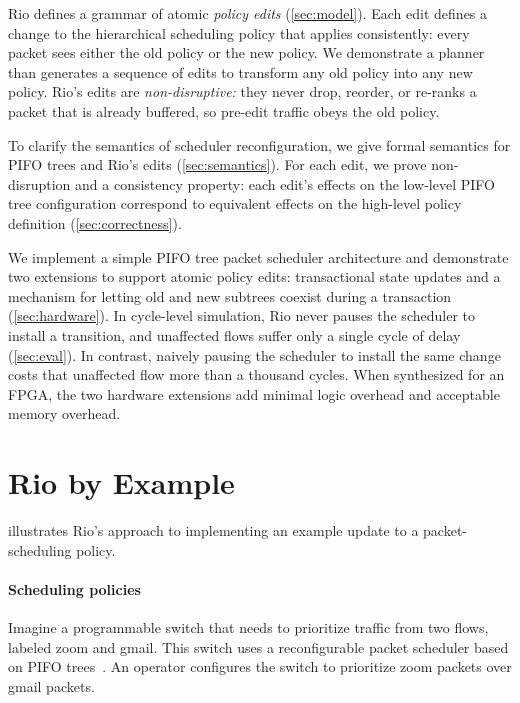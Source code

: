 \documentclass[sigplan,anonymous,review,nonacm]{acmart}
\begin{document}
Rio defines a grammar of atomic \emph{policy edits} (\cref{sec:model}).
Each edit defines a change to the hierarchical scheduling policy that applies consistently:
every packet sees either the old policy or the new policy.
We demonstrate a planner than generates a sequence of edits to transform any old policy into any new policy.
Rio's edits are \emph{non-disruptive:}
they never drop, reorder, or re-ranks a packet that is already buffered,
so pre-edit traffic obeys the old policy.

To clarify the semantics of scheduler reconfiguration,
we give formal semantics for PIFO trees and Rio's edits (\cref{sec:semantics}).
For each edit, we prove non-disruption and a consistency property:
each edit's effects on the low-level PIFO tree configuration
correspond to equivalent effects on the high-level policy definition (\cref{sec:correctness}).

We implement a simple PIFO tree packet scheduler architecture and demonstrate two extensions to support atomic policy edits:
transactional state updates and a mechanism for letting old and new subtrees coexist during a transaction (\cref{sec:hardware}).
In cycle-level simulation, Rio never pauses the scheduler to install a transition, and unaffected flows suffer only a single cycle of delay (\cref{sec:eval}).
In contrast, naively pausing the scheduler to install the same change costs that unaffected flow more than a thousand cycles.
When synthesized for an FPGA, the two hardware extensions add minimal logic overhead and acceptable memory overhead.

\section{Rio by Example}\label{sec:tour}

 illustrates Rio's approach to implementing an example update to a packet-scheduling policy.

\paragraph{Scheduling policies}

Imagine a programmable switch that needs to prioritize traffic from two flows, labeled \textsf{zoom} and \textsf{gmail}.
This switch uses a reconfigurable packet scheduler based on PIFO trees~\cite{Sivaraman16}.
An operator configures the switch to prioritize \textsf{zoom} packets over \textsf{gmail} packets.
\end{document}
